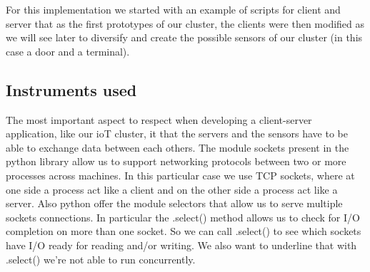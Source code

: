 For this implementation we started with an example of scripts for client and server that as the first prototypes of our cluster, the clients were then modified as we will see later to diversify and create the possible sensors of our cluster (in this case a door and a terminal).
\\

\subsection{Instruments used}
 The most important aspect 
to respect when developing a client-server application, like our ioT cluster, it that the servers and the sensors have to be able to exchange data 
between each others. The module sockets present in  the python library allow us to support networking protocols between two or more processes across machines. In this particular case we use TCP sockets, where at one side a process act like a client and on the other side a process act like a server. Also python offer the module selectors that allow us to serve multiple sockets connections. In particular the .select() method allows us to check for I/O completion on more than one socket. So we can call .select() to see which sockets have I/O ready for reading and/or writing.  We also want to underline that with .select()  we’re not able to run concurrently. 

